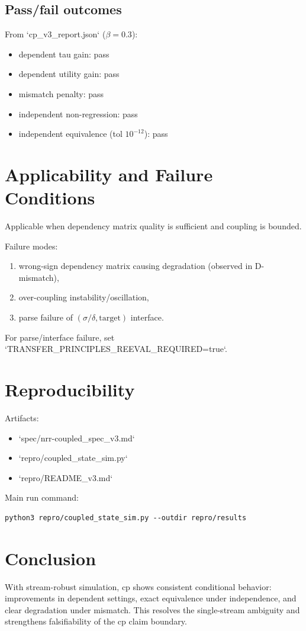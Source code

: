 \documentclass[11pt,a4paper]{article}
\begin{document}
\subsection{Pass/fail outcomes}
From `cp\_v3\_report.json` (\(\beta=0.3\)):
\begin{itemize}
  \item dependent tau gain: pass
  \item dependent utility gain: pass
  \item mismatch penalty: pass
  \item independent non-regression: pass
  \item independent equivalence (tol \(10^{-12}\)): pass
\end{itemize}

\section{Applicability and Failure Conditions}
Applicable when dependency matrix quality is sufficient and coupling is bounded.

Failure modes:
\begin{enumerate}
  \item wrong-sign dependency matrix causing degradation (observed in D-mismatch),
  \item over-coupling instability/oscillation,
  \item parse failure of \((\sigma/\delta,\text{target})\) interface.
\end{enumerate}
For parse/interface failure, set `TRANSFER\_PRINCIPLES\_REEVAL\_REQUIRED=true`.

\section{Reproducibility}
Artifacts:
\begin{itemize}
  \item `spec/nrr-coupled\_spec\_v3.md`
  \item `repro/coupled\_state\_sim.py`
  \item `repro/README\_v3.md`
\end{itemize}

Main run command:
\begin{lstlisting}
python3 repro/coupled_state_sim.py --outdir repro/results
\end{lstlisting}

\section{Conclusion}
With stream-robust simulation, cp shows consistent conditional behavior: improvements in dependent settings, exact equivalence under independence, and clear degradation under mismatch. This resolves the single-stream ambiguity and strengthens falsifiability of the cp claim boundary.
\end{document}
